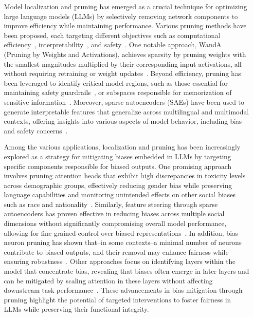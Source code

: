 Model localization and pruning has emerged as a crucial technique for optimizing large language models (LLMs) by selectively removing network components to improve efficiency while maintaining performance. Various pruning methods have been proposed, each targeting different objectives such as computational efficiency~\cite{Wang_2021,voita2019analyzing,zhang2021know,sun2024simpleeffectivepruningapproach}, interpretability~\cite{templeton2024scaling, paulo2024automaticallyinterpretingmillionsfeatures}, and safety~\cite{chavhan2024memorizedimagesdiffusionmodels, chang2024localizationmethodsactuallylocalize}. One notable approach, WandA (Pruning by Weights and Activations), achieves sparsity by pruning weights with the smallest magnitudes multiplied by their corresponding input activations, all without requiring retraining or weight updates~\cite{sun2024simpleeffectivepruningapproach}. Beyond efficiency, pruning has been leveraged to identify critical model regions, such as those essential for maintaining safety guardrails~\cite{wei2024assessingbrittlenesssafetyalignment}, or subspaces responsible for memorization of sensitive information~\cite{chavhan2024memorizedimagesdiffusionmodels, chang2024localizationmethodsactuallylocalize}. Moreover, sparse autoencoders (SAEs) have been used to generate interpretable features that generalize across multilingual and multimodal contexts, offering insights into various aspects of model behavior, including bias and safety concerns~\cite{templeton2024scaling, paulo2024automaticallyinterpretingmillionsfeatures}.

Among the various applications, localization and pruning has been increasingly explored as a strategy for mitigating biases embedded in LLMs by targeting specific components responsible for biased outputs. One promising approach involves pruning attention heads that exhibit high discrepancies in toxicity levels across demographic groups, effectively reducing gender bias while preserving language capabilities and monitoring unintended effects on other social biases such as race and nationality~\cite{zayed2023FairnessAwarePruning}. Similarly, feature steering through sparse autoencoders has proven effective in reducing biases across multiple social dimensions without significantly compromising overall model performance, allowing for fine-grained control over biased representations~\cite{durmus2024steering}. In addition, bias neuron pruning has shown that--in some contexts--a minimal number of neurons contribute to biased outputs, and their removal may enhance fairness while ensuring robustness~\cite{yang2024mitigatingbiasesinstructionfollowinglanguage}. Other approaches focus on identifying layers within the model that concentrate bias, revealing that biases often emerge in later layers and can be mitigated by scaling attention in these layers without affecting downstream task performance~\cite{adiga2024attention}. These advancements in bias mitigation through pruning highlight the potential of targeted interventions to foster fairness in LLMs while preserving their functional integrity.

